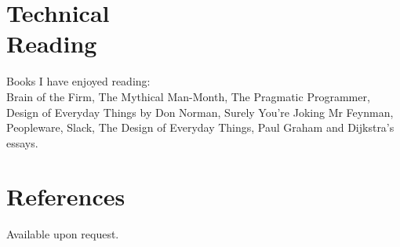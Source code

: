 \documentclass[line,margin]{res}
\newcommand{\ampersand}{\&}
\begin{document}
\begin{resume}
\begin{position}
\begin{comment}
\begin{tabular}{ l r r }
	Mathematics & (a year early) GCSE & A* \\
	Science & Double Award GCSE & AA \\
	English & GCSE & A \\
	History & GCSE & B \\
	Systems {\ampersand} Control & GCSE & B \\
	ICT & Short Course GCSE & C \\
	Statistics & GCSE & C \\
	English Literature & GCSE & C \\
	Geography & GCSE & D \\
	Drama & GCSE & F \\
\end{tabular}
\end{comment}
\end{position}

\section{Technical \\ Reading}
Books I have enjoyed reading: \\
Brain of the Firm,
The Mythical Man-Month, %
The Pragmatic Programmer,
Design of Everyday Things by Don Norman,
Surely You're Joking Mr Feynman,
Peopleware, %
Slack,
The Design of Everyday Things,
Paul Graham and Dijkstra's essays.

\section{References}
Available upon request.




\end{resume}
\end{document}
